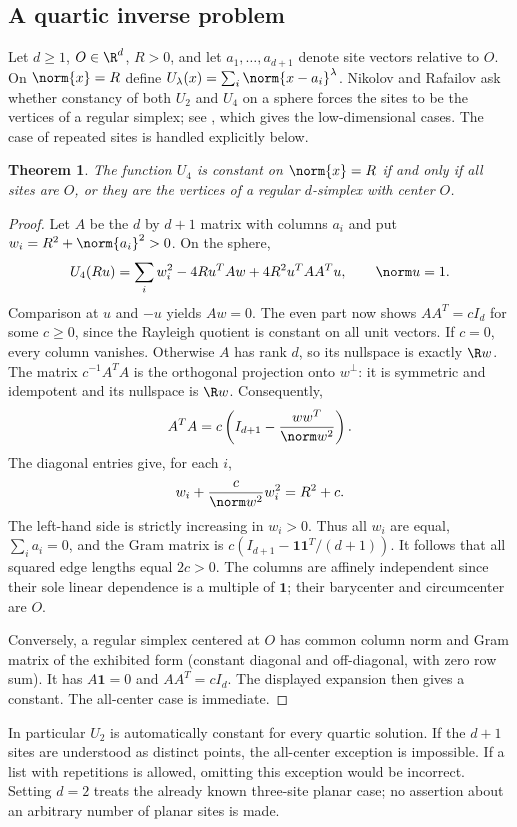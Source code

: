 \documentclass[11pt,a4paper]{article}
\numberwithin{equation}{section}
\newtheorem{theorem}{Theorem}[section]
\theoremstyle{definition}
\theoremstyle{remark}
\begin{document}
\subsection{A quartic inverse problem}
Let $d\ge1$, $O\in\R^d$, $R>0$, and let $a_1,\ldots,a_{d+1}$ denote site vectors relative to $O$. On $\norm{x}=R$ define $U_\lambda(x)=\sum_i\norm{x-a_i}^\lambda$. Nikolov and Rafailov ask whether constancy of both $U_2$ and $U_4$ on a sphere forces the sites to be the vertices of a regular simplex; see \cite[arXiv version, Conjecture 2, p.~11]{r33keio:nr}, which gives the low-dimensional cases. The case of repeated sites is handled explicitly below.
\begin{theorem}\label{r33keio:simplex}
The function $U_4$ is constant on $\norm{x}=R$ if and only if all sites are $O$, or they are the vertices of a regular $d$-simplex with center $O$.
\end{theorem}
\begin{proof}
Let $A$ be the $d$ by $d+1$ matrix with columns $a_i$ and put $w_i=R^2+\norm{a_i}^2>0$. On the sphere,
\[
 U_4(Ru)=\sum_i w_i^2-4R u^T A w+4R^2u^TAA^Tu,\qquad \norm u=1.
\]
Comparison at $u$ and $-u$ yields $Aw=0$. The even part now shows $AA^T=cI_d$ for some $c\ge0$, since the Rayleigh quotient is constant on all unit vectors. If $c=0$, every column vanishes. Otherwise $A$ has rank $d$, so its nullspace is exactly $\R w$. The matrix $c^{-1}A^TA$ is the orthogonal projection onto $w^\perp$: it is symmetric and idempotent and its nullspace is $\R w$. Consequently,
\[
 A^TA=c\left(I_{d+1}-\frac{ww^T}{\norm w^2}\right).
\]
The diagonal entries give, for each $i$,
\[
 w_i+\frac{c}{\norm w^2}w_i^2=R^2+c.
\]
The left-hand side is strictly increasing in $w_i>0$. Thus all $w_i$ are equal, $\sum_i a_i=0$, and the Gram matrix is $c(I_{d+1}-\mathbf1\mathbf1^T/(d+1))$. It follows that all squared edge lengths equal $2c>0$. The columns are affinely independent since their sole linear dependence is a multiple of $\mathbf1$; their barycenter and circumcenter are $O$.

Conversely, a regular simplex centered at $O$ has common column norm and Gram matrix of the exhibited form (constant diagonal and off-diagonal, with zero row sum). It has $A\mathbf1=0$ and $AA^T=cI_d$. The displayed expansion then gives a constant. The all-center case is immediate.
\end{proof}
In particular $U_2$ is automatically constant for every quartic solution. If the $d+1$ sites are understood as distinct points, the all-center exception is impossible. If a list with repetitions is allowed, omitting this exception would be incorrect. Setting $d=2$ treats the already known three-site planar case; no assertion about an arbitrary number of planar sites is made.
\end{document}
